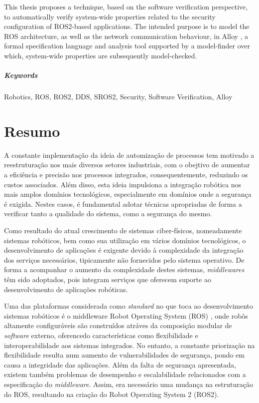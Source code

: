 \documentclass[
  oneside,
  11pt, a4paper,
  footinclude=true,
  headinclude=true,
  cleardoublepage=empty
]{scrbook}
\begin{document}
	This thesis proposes a technique, based on the software verification perspective, to automatically verify system-wide properties related to the security configuration of ROS2-based applications. The intended purpose is to model the ROS architecture, as well as the network communication behaviour, in Alloy \cite{alloy-6}, a formal specification language and analysis tool supported by a model-finder over which, system-wide properties are subsequently model-checked.

\paragraph{Keywords} Robotics, ROS, ROS2, DDS, SROS2, Security, Software Verification, Alloy
	\cleardoublepage

\chapter*{Resumo}

	A constante implementação da ideia de automização de processos tem motivado a reestruturação nos mais diversos setores industriais, com o obejtivo de aumentar a eficiência e precisão nos processos integrados, consequentemente, reduzindo os custos associados. Além disso, esta ideia impulsiona a integração robótica nos mais amplos domínios tecnológicos, especialmente em domínios onde a segurança é exigida. Nestes casos, é fundamental adotar técnicas apropriadas de forma a verificar tanto a qualidade do sistema, como a segurança do mesmo.

	Como resultado do atual crescimento de sistemas ciber-físicos, nomeadamente sistemas robóticos, bem como sua utilização em vários domínios tecnológicos, o desenvolvimento de aplicações é exigente devido à complexidade da integração dos serviços necessários, tipicamente não fornecidos pelo sistema operativo. De forma a acompanhar o aumento da complexidade destes sistemas, \textit{middlewares} têm sido adoptados, pois integram serviços que oferecem suporte ao desenvolvimento de aplicações robóticas.

	Uma das plataformas considerada como \textit{standard} no que toca ao desenvolvimento sistemas robóticos é o middleware Robot Operating System (ROS) \cite{1}, onde robôs altamente configuráveis são construídos atráves da composição modular de \textit{software} externo, oferencedo características como flexibilidade e interoperabilidade aos sistemas integrados. No entanto, a constante priorização na flexibilidade resulta num aumento de vulnerabilidades de segurança, pondo em causa a integridade das aplicações. Além da falta de segurança apresentada, existem também problemas de desempenho e escalabilidade relacionados com a especificação do \textit{middleware}. Assim, era necessário uma mudança na estruturação do ROS, resultando na criação do Robot Operating System 2 (ROS2).
\end{document}
